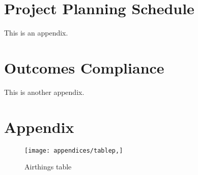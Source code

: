 \chapter{Project Planning Schedule}
\makeatletter{}\makeatother
\label{appen:derivations_bigramseg}



This is an appendix.

\chapter{Outcomes Compliance}
\makeatletter{}\makeatother
\label{appen:derivations_bigramseg}

This is another appendix.

\chapter{Appendix}
\makeatletter{}\makeatother

\begin{figure}[!htb]
	\centering
	\texttt{[image: appendices/tablep,]}
	\caption{Airthings table}
	\label{fig:airthingstable}
\end{figure}
